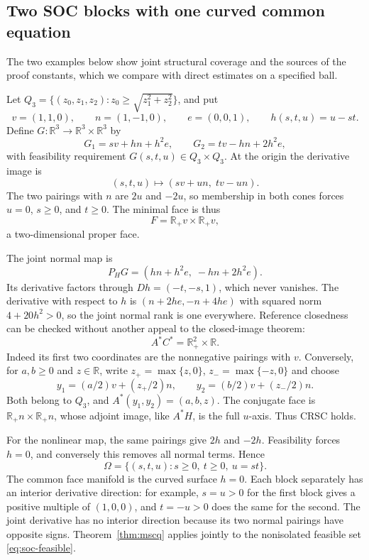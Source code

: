 \documentclass[11pt]{article}
\numberwithin{equation}{section}
\theoremstyle{definition}
\theoremstyle{remark}
\newcommand{\R}{\mathbb R}
\begin{document}
\subsection{Two SOC blocks with one curved common equation}

The two examples below show joint structural coverage and the sources
of the proof constants, which we compare with direct estimates on a
specified ball.

Let $Q_3=\{(z_0,z_1,z_2):z_0\geq\sqrt{z_1^2+z_2^2}\}$, and put
\[
 v=(1,1,0),\qquad n=(1,-1,0),\qquad e=(0,0,1),
 \qquad h(s,t,u)=u-st.
\]
Define $G:\R^3\to\R^3\times\R^3$ by
\begin{equation}
 G_1=sv+hn+h^2e,\qquad
 G_2=tv-hn+2h^2e,
 \label{eq:soc-example}
\end{equation}
with feasibility requirement $G(s,t,u)\in Q_3\times Q_3$.
At the origin the derivative image is
\[
 (s,t,u)\longmapsto(sv+un,\;tv-un).
\]
The two pairings with $n$ are $2u$ and $-2u$, so membership in both cones
forces $u=0$, $s\geq0$, and $t\geq0$. The minimal face is thus
\[
 F=\R_+v\times\R_+v,
\]
a two-dimensional proper face.

The joint normal map is
\[
 P_HG=(hn+h^2e,\;-hn+2h^2e).
\]
Its derivative factors through $Dh=(-t,-s,1)$, which never vanishes.
The derivative with respect to $h$ is $(n+2he,-n+4he)$ with squared
norm $4+20h^2>0$, so the joint normal rank is one everywhere.
Reference closedness can be checked without another appeal to the
closed-image theorem:
\begin{equation}
 A^*C^*=\R_+^2\times\R.
 \label{eq:soc-adjoint}
\end{equation}
Indeed its first two coordinates are the nonnegative pairings with $v$.
Conversely, for $a,b\geq0$ and $z\in\R$, write
$z_+=\max\{z,0\}$, $z_-=\max\{-z,0\}$ and choose
\[
 y_1=(a/2)v+(z_+/2)n,\qquad y_2=(b/2)v+(z_-/2)n.
\]
Both belong to $Q_3$, and $A^*(y_1,y_2)=(a,b,z)$.
The conjugate face is $\R_+n\times\R_+n$, whose adjoint image, like
$A^*H$, is the full $u$-axis. Thus CRSC holds.

For the nonlinear map, the same pairings give $2h$ and $-2h$. Feasibility
forces $h=0$, and conversely this removes all normal terms. Hence
\begin{equation}
 \Omega=\{(s,t,u):s\geq0,\ t\geq0,\ u=st\}.
 \label{eq:soc-feasible}
\end{equation}
The common face manifold is the curved surface $h=0$.
Each block separately has an interior derivative direction: for example,
$s=u>0$ for the first block gives a positive multiple of $(1,0,0)$,
and $t=-u>0$ does the same for the second. The joint derivative has no
interior direction because its two normal pairings have opposite signs.
Theorem~\ref{thm:mscq} applies jointly to the nonisolated feasible set
\eqref{eq:soc-feasible}.
\end{document}
